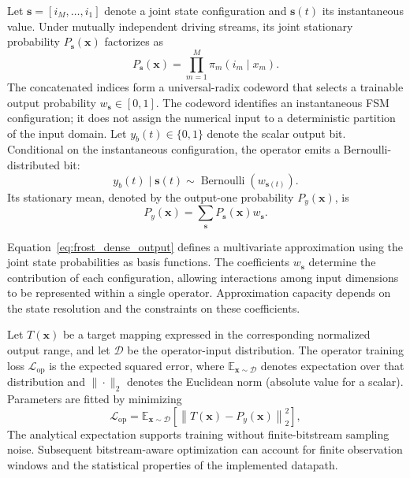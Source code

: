 \documentclass[pdflatex,sn-mathphys-num]{sn-jnl}
\theoremstyle{thmstyleone}
\theoremstyle{thmstyletwo}
\theoremstyle{thmstylethree}
\begin{document}
Let $\boldsymbol{s}=[i_M,\ldots,i_1]$ denote a joint state configuration and $\boldsymbol{s}(t)$ its instantaneous value. Under mutually independent driving streams, its joint stationary probability $P_{\boldsymbol{s}}(\boldsymbol{x})$ factorizes as~\cite{feng2025smurf}
\begin{equation}
P_{\boldsymbol{s}}(\boldsymbol{x}) = \prod_{m=1}^{M} \pi_m(i_m\mid x_m). \label{eq:joint_state_probability}
\end{equation}
The concatenated indices form a universal-radix codeword that selects a trainable output probability $w_{\boldsymbol{s}}\in[0,1]$. The codeword identifies an instantaneous FSM configuration; it does not assign the numerical input to a deterministic partition of the input domain. Let $y_b(t)\in\{0,1\}$ denote the scalar output bit. Conditional on the instantaneous configuration, the operator emits a Bernoulli-distributed bit:
\begin{equation}
y_b(t)\mid\boldsymbol{s}(t) \sim \operatorname{Bernoulli} \left( w_{\boldsymbol{s}(t)} \right). \label{eq:bernoulli_emission}
\end{equation}
Its stationary mean, denoted by the output-one probability $P_y(\boldsymbol{x})$, is
\begin{equation}
P_y(\boldsymbol{x}) = \sum_{\boldsymbol{s}} P_{\boldsymbol{s}}(\boldsymbol{x}) w_{\boldsymbol{s}}. \label{eq:frost_dense_output}
\end{equation}

Equation~\eqref{eq:frost_dense_output} defines a multivariate approximation using the joint state probabilities as basis functions. The coefficients $w_{\boldsymbol{s}}$ determine the contribution of each configuration, allowing interactions among input dimensions to be represented within a single operator. Approximation capacity depends on the state resolution and the constraints on these coefficients.

Let $T(\boldsymbol{x})$ be a target mapping expressed in the corresponding normalized output range, and let $\mathcal{D}$ be the operator-input distribution. The operator training loss $\mathcal{L}_{\mathrm{op}}$ is the expected squared error, where $\mathbb{E}_{\boldsymbol{x}\sim\mathcal{D}}$ denotes expectation over that distribution and $\|\cdot\|_2$ denotes the Euclidean norm (absolute value for a scalar). Parameters are fitted by minimizing~\cite{feng2025smurf,feng2026smurf}
\begin{equation}
\mathcal{L}_{\mathrm{op}} = \mathbb{E}_{\boldsymbol{x}\sim\mathcal{D}} \left[ \left\| T(\boldsymbol{x})-P_y(\boldsymbol{x}) \right\|_2^2 \right], \label{eq:operator_training_loss}
\end{equation}
The analytical expectation supports training without finite-bitstream sampling noise. Subsequent bitstream-aware optimization can account for finite observation windows and the statistical properties of the implemented datapath.
\end{document}
